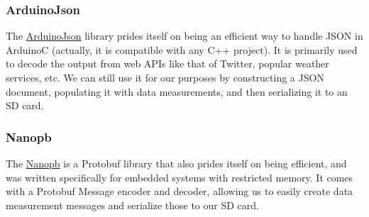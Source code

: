 \subsubsection{ArduinoJson}
The \href{https://arduinojson.org/}{ArduinoJson} library prides itself on being an efficient way to handle JSON in ArduinoC (actually, it is compatible with any C++ project). It is primarily used to decode the output from web APIs like that of Twitter, popular weather services, etc. We can still use it for our purposes by constructing a JSON document, populating it with data measurements, and then serializing it to an SD card. 

\subsubsection{Nanopb}
The \href{https://github.com/nanopb/nanopb}{Nanopb} is a Protobuf library that also prides itself on being efficient, and was written specifically for embedded systems with restricted memory. It comes with a Protobuf Message encoder and decoder, allowing us to easily create data measurement messages and serialize those to our SD card.

